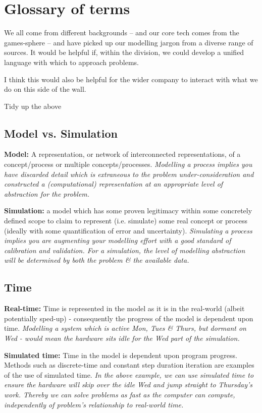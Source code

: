 \section{Glossary of terms}

We all come from different backgrounds -- and our core tech comes from the
games-sphere -- and have picked up our modelling jargon from a diverse range of
sources. It would be helpful if, within the division, we could develop a
unified language with which to approach problems.

I think this would also be helpful for the wider company to interact with what
we do on this side of the wall.

\color{red} Tidy up the above \color{black}

\subsection{Model vs. Simulation}

\noindent \textbf{Model:} A representation, or network of interconnected representations,
of a concept/process or multiple concepts/processes.
\textit{Modelling a process implies you have discarded detail which is
extraneous to the problem under-consideration and constructed a (computational)
representation at an appropriate level of abstraction for the problem.}

\noindent \textbf{Simulation:} a model which has some proven legitimacy within some concretely
defined scope to claim to represent (i.e. simulate) some real concept or
process (ideally with some quantification of error and uncertainty).
\textit{Simulating a process implies you are augmenting your modelling effort with a
good standard of calibration and validation. For a simulation, the level of
modelling abstraction will be determined by both the problem \& the available
data.}

\subsection{Time}

\noindent \textbf{Real-time:} Time is represented in the model as it is in the real-world
(albeit potentially sped-up) - consequently the progress of the model is
dependent upon time.  \textit{Modelling a system which is active Mon, Tues \& Thurs, but
dormant on Wed - would mean the hardware sits idle for the Wed part of the
simulation.}

\noindent \textbf{Simulated time:} Time in the model is dependent upon program progress. Methods
such as discrete-time and constant step duration iteration are examples of the
use of simulated time.  \textit{In the above example, we can use simulated time to
ensure the hardware will skip over the idle Wed and jump straight to Thursday’s
work. Thereby we can solve problems as fast as the computer can compute,
independently of problem’s relationship to real-world time.}

